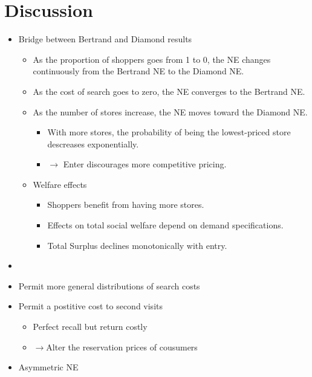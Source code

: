 \documentclass{beamer}
\begin{document}
\section{Discussion}
\begin{frame}
\begin{itemize}
	\item Bridge between Bertrand and Diamond results
	\begin{itemize}
		\item As the proportion of shoppers goes from 1 to 0, the NE changes continuously from the Bertrand NE to the Diamond NE.
		\item As the cost of search goes to zero, the NE converges to the Bertrand NE.
		\item As the number of stores increase, the NE moves toward the Diamond NE.
		\begin{itemize}
			\item With more stores, the probability of being the lowest-priced store descreases exponentially.
			\item $\to$ Enter discourages more competitive pricing.
		\end{itemize}
		\item Welfare effects
		\begin{itemize}
		     \item Shoppers benefit from having more stores.
		     \item Effects on total social welfare depend on demand specifications.
		     \item Total Surplus declines monotonically with entry.
	    \end{itemize}
	\end{itemize}
\end{itemize}
\end{frame}

\begin{frame}
\begin{itemize}
	\item 
\end{itemize}
\end{frame}

\begin{frame}
\begin{itemize}
	\item Permit more general distributions of search costs
	\item Permit a postitive cost to second visits
	\begin{itemize}
		\item Perfect recall but return costly
		\item $\to$Alter the reservation prices of cousumers
	\end{itemize}
	\item Asymmetric NE
\end{itemize} 
\end{frame}
\end{document}
